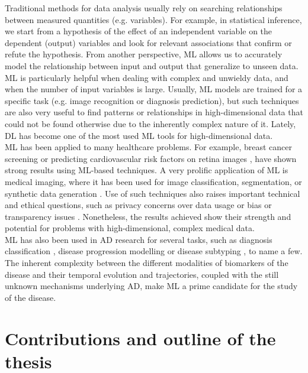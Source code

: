 Traditional methods for data analysis usually rely on searching relationships between measured quantities (e.g. variables). For example, in statistical inference, we start from a hypothesis of the effect of an independent variable on the dependent (output) variables and look for relevant associations that confirm or refute the hypothesis. From another perspective, ML allows us to accurately model the relationship between input and output that generalize to unseen data. ML is particularly helpful when dealing with complex and unwieldy data, and when the number of input variables is large. Usually, ML models are trained for a specific task (e.g. image recognition or diagnosis prediction), but such techniques are also very useful to find patterns or relationships in high-dimensional data that could not be found otherwise due to the inherently complex nature of it. Lately, DL has become one of the most used ML tools for high-dimensional data. \\

ML has been applied to many healthcare problems. For example, breast cancer screening \cite{McKinney2020} or predicting cardiovascular risk factors on retina images \cite{Poplin2018}, have shown strong results using ML-based techniques. A very prolific application of ML is medical imaging, where it has been used for image classification, segmentation, or synthetic data generation \cite{Litjens2017}. Use of such techniques also raises important technical and ethical questions, such as privacy concerns over data usage \cite{Yang2019} or bias or transparency issues \cite{Karikari2020, Haibe-Kains2020}. Nonetheless, the results achieved show their strength and potential for problems with high-dimensional, complex medical data. \\

ML has also been used in AD research for several tasks, such as diagnosis classification \cite{Rathore2017}, disease progression modelling \cite{Oxtoby2017,Lei2020,Fisher2019} or disease subtyping \cite{Young2017}, to name a few. The inherent complexity between the different modalities of biomarkers of the disease and their temporal evolution and trajectories, coupled with the still unknown mechanisms underlying AD, make ML a prime candidate for the study of the disease. \\

\section{Contributions and outline of the thesis}


